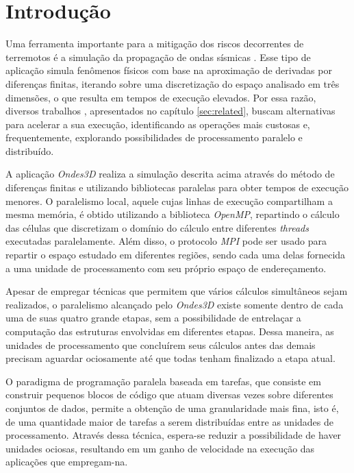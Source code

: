 \documentclass[cic,tc]{iiufrgs}
\begin{document}
\tableofcontents


\chapter{Introdução}
Uma ferramenta importante para a mitigação dos riscos decorrentes de terremotos é a simulação da propagação de ondas sísmicas \cite{Dupros2010HighperformanceFS}. Esse tipo de aplicação
simula fenômenos físicos com base na aproximação de derivadas por diferenças finitas, iterando sobre uma discretização do espaço analisado em três dimensões, o que resulta em tempos
de execução elevados. Por essa razão, diversos trabalhos \cite{boito, dupros:hal-00797682, victor}, apresentados no capítulo \ref{sec:related}, buscam alternativas para acelerar a sua
execução, identificando as operações mais custosas e, frequentemente, explorando possibilidades de processamento paralelo e distribuído.

A aplicação \textit{Ondes3D} realiza a simulação descrita acima através do método de diferenças finitas e utilizando bibliotecas paralelas para obter tempos de execução menores. O
paralelismo local, aquele cujas linhas de execução compartilham a mesma memória, é obtido utilizando a biblioteca \textit{OpenMP}, repartindo o cálculo das células que discretizam o
domínio do cálculo entre diferentes \textit{threads} executadas paralelamente. Além disso, o protocolo \textit{MPI} pode ser usado para repartir o espaço estudado em diferentes regiões,
sendo cada uma delas fornecida a uma unidade de processamento com seu próprio espaço de endereçamento.

Apesar de empregar técnicas que permitem que vários cálculos simultâneos sejam realizados, o paralelismo alcançado pelo \textit{Ondes3D} existe somente dentro de cada uma de suas
quatro grande etapas, sem a possibilidade de entrelaçar a computação das estruturas envolvidas em diferentes etapas. Dessa maneira, as unidades de processamento que concluírem seus
cálculos antes das demais precisam aguardar ociosamente até que todas tenham finalizado a etapa atual.

O paradigma de programação paralela baseada em tarefas, que consiste em construir pequenos blocos de código que atuam diversas vezes sobre diferentes conjuntos de dados, permite a
obtenção de uma granularidade mais fina, isto é, de uma quantidade maior de tarefas a serem distribuídas entre as unidades de processamento. Através dessa técnica, espera-se
reduzir a possibilidade de haver unidades ociosas, resultando em um ganho de velocidade na execução das aplicações que empregam-na.
\end{document}

